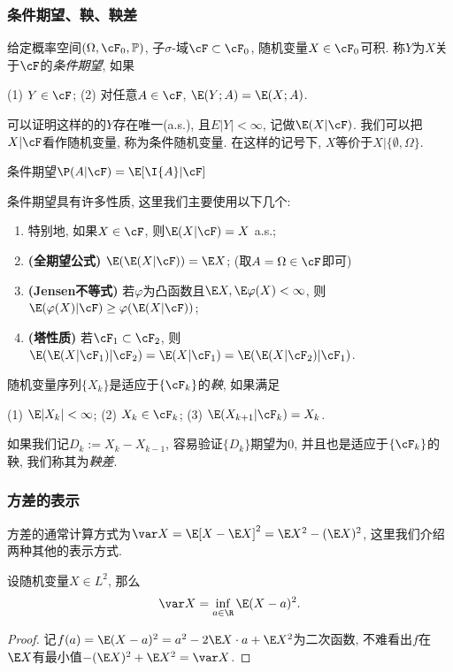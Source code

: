 \subsubsection{条件期望、鞅、鞅差}

给定概率空间$(\Omega, \cF_0, \mathbb{P})$, 子$\sigma$-域$\cF \subset \cF_0$, 随机变量$X \in \cF_0$可积. 
称$Y$为$X$关于$\cF$的\emph{条件期望}, 如果
\begin{center}
	(1) $Y \in \cF$; \quad
	(2) 对任意$A \in \cF$, $\E(Y;A) = \E(X;A)$. 
\end{center}
可以证明这样的的$Y$存在唯一(a.s.), 且$E|Y| < \infty$, 记做$\E(X|\cF)$. 
我们可以把$X | \cF$看作随机变量, 称为条件随机变量. 
在这样的记号下, $X$等价于$X | \{\emptyset, \Omega\}$. 

条件期望$\P(A | \cF) = \E[\I{A} | \cF]$

条件期望具有许多性质, 这里我们主要使用以下几个: 
	\begin{enumerate}[label=(\roman*)]
		\item 特别地, 如果$X \in \cF$, 则$\E(X|\cF) = X$ a.s.;
		\item \textbf{(全期望公式)} $\E(\E(X|\cF)) = \E X$; (取$A = \Omega \in \cF$即可)
		\item \textbf{(Jensen不等式)} 若$\varphi$为凸函数且$\E X, \E \varphi(X) < \infty$, 则$\E(\varphi(X) | \cF) \geq \varphi(\E(X|\cF))$; 
		\item \textbf{(塔性质)} 若$\cF_1 \subset \cF_2$, 则$\E(\E(X|\cF_1)|\cF_2) = \E(X|\cF_1) = \E(\E(X|\cF_2)|\cF_1)$. 
	\end{enumerate}
随机变量序列$\{X_k\}$是适应于$\{\cF_k\}$的\emph{鞅}, 如果满足
\begin{center}
	(1) $\E |X_k| < \infty$; \quad
	(2) $X_k \in \cF_k$; \quad
	(3) $\E(X_{k+1}|\cF_k) = X_k$.
\end{center}
如果我们记$D_k := X_k - X_{k-1}$, 容易验证$\{D_k\}$期望为$0$, 并且也是适应于$\{\cF_k\}$的鞅, 我们称其为\emph{鞅差}. 

\subsubsection{方差的表示}

方差的通常计算方式为$\var X = \E[X - \E X]^2 = \E X^2 - (\E X)^2$, 这里我们介绍两种其他的表示方式. 

\begin{lemma}[方差的变分表示]
	设随机变量$X \in L^2$, 那么
	\begin{equation*}
		\var X = \inf_{a \in \R} \E (X - a)^2. 
	\end{equation*}
\end{lemma}
\begin{proof}
	记$f(a) =  \E (X - a)^2 = a^2 - 2 \E X \cdot a + \E X^2$为二次函数, 不难看出$f$在$\E X$有最小值$- (\E X)^2 + \E X^2 = \var X$. 
\end{proof}

